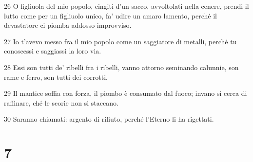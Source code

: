 \par 26 O figliuola del mio popolo, cingiti d'un sacco, avvoltolati nella cenere, prendi il lutto come per un figliuolo unico, fa' udire un amaro lamento, perché il devastatore ci piomba addosso improvviso.
\par 27 Io t'avevo messo fra il mio popolo come un saggiatore di metalli, perché tu conoscessi e saggiassi la loro via.
\par 28 Essi son tutti de' ribelli fra i ribelli, vanno attorno seminando calunnie, son rame e ferro, son tutti dei corrotti.
\par 29 Il mantice soffia con forza, il piombo è consumato dal fuoco; invano si cerca di raffinare, ché le scorie non si staccano.
\par 30 Saranno chiamati: argento di rifiuto, perché l'Eterno li ha rigettati.

\chapter{7}

